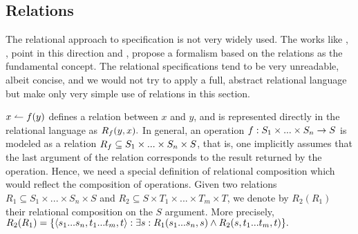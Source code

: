 \subsection{Relations}
The relational approach to specification is not very widely used. The works like \cite{Brnc}, \cite{Brbpl}, \cite{Stark} point in this direction and \cite{Hoog}, \cite{Pers} propose a formalism based on the 
relations as the fundamental concept. The relational specifications tend to be very unreadable, albeit concise, and we would not try to apply a full, abstract
relational language but make only very simple use of relations in this section.

$x\leftharpoonup f(y)$ defines a relation between $x$ and $y$, and is represented directly in the relational language as $R_{f}(y,x).$ In general, an operation $f:S_1\times ...\times S_n\rightarrow S$ is modeled as a relation
$R_{f}\subseteq S_1\times ...\times S_n\times S$, that is, one implicitly assumes that the last argument of the relation corresponds to the result returned by the operation. Hence, we need a special definition of relational composition which would reflect the composition of operations. Given two relations $R_1\subseteq S_1\times ...\times S_n\times S$ and $R_2\subseteq S\times T_1\times ...\times T_m\times T$, we denote by $R_2(R_1)$
their relational composition on the $S$ argument. More precisely, $R_2(R_1)=\{\langle s_1...s_n,t_1...t_m,t\rangle:\exists s: R_1(s_1...s_n,s)\land 
R_2(s,t_1...t_m,t)\}.$

